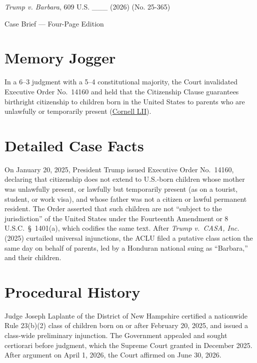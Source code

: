 \documentclass[12pt]{article}
\begin{document}
\begin{center}
{\LARGE \textit{Trump v. Barbara}, 609 U.S. \_\_\_ (2026) (No. 25-365)\par}
\vspace{0.8em}
{\large Case Brief --- Four-Page Edition\par}
\end{center}
\vspace{1em}

\section{Memory Jogger}

In a 6--3 judgment with a 5--4 constitutional majority, the Court invalidated Executive Order No.~14160 and held that the Citizenship Clause guarantees birthright citizenship to children born in the United States to parents who are unlawfully or temporarily present (\href{https://www.law.cornell.edu/supremecourt/text/25-365}{Cornell LII}).

\section{Detailed Case Facts}

On January 20, 2025, President Trump issued Executive Order No.~14160, declaring that citizenship does not extend to U.S.-born children whose mother was unlawfully present, or lawfully but temporarily present (as on a tourist, student, or work visa), and whose father was not a citizen or lawful permanent resident. The Order asserted that such children are not ``subject to the jurisdiction'' of the United States under the Fourteenth Amendment or 8 U.S.C.\ \S\ 1401(a), which codifies the same text. After \textit{Trump v.\ CASA, Inc.} (2025) curtailed universal injunctions, the ACLU filed a putative class action the same day on behalf of parents, led by a Honduran national suing as ``Barbara,'' and their children.

\section{Procedural History}

Judge Joseph Laplante of the District of New Hampshire certified a nationwide Rule 23(b)(2) class of children born on or after February 20, 2025, and issued a class-wide preliminary injunction. The Government appealed and sought certiorari before judgment, which the Supreme Court granted in December 2025. After argument on April 1, 2026, the Court affirmed on June 30, 2026.
\end{document}
